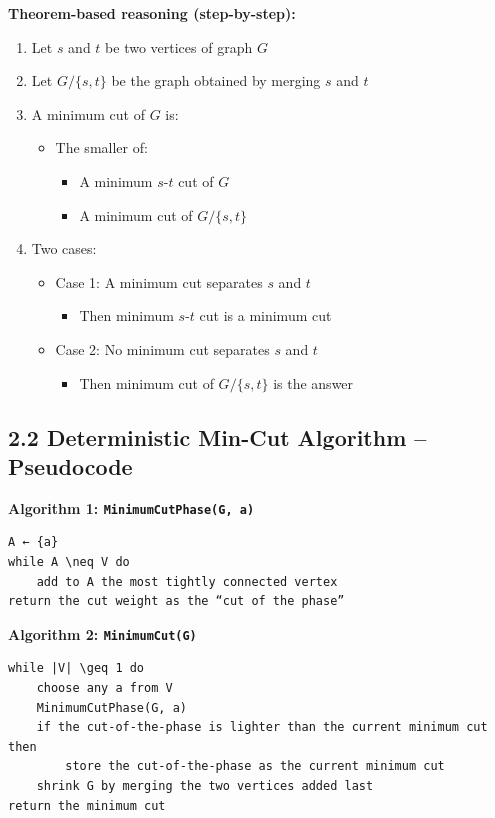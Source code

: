 \documentclass[11pt]{article}
\begin{document}
\textbf{Theorem-based reasoning (step-by-step):}
\begin{enumerate}
    \item Let \( s \) and \( t \) be two vertices of graph \( G \)
    \item Let \( G/\{s,t\} \) be the graph obtained by merging \( s \) and \( t \)
    \item A minimum cut of \( G \) is:
    \begin{itemize}
        \item The smaller of:
        \begin{itemize}
            \item A minimum \( s\text{-}t \) cut of \( G \)
            \item A minimum cut of \( G/\{s,t\} \)
        \end{itemize}
    \end{itemize}
    \item Two cases:
    \begin{itemize}
        \item Case 1: A minimum cut separates \( s \) and \( t \)
        \begin{itemize}
            \item Then minimum \( s\text{-}t \) cut is a minimum cut
        \end{itemize}
        \item Case 2: No minimum cut separates \( s \) and \( t \)
        \begin{itemize}
            \item Then minimum cut of \( G/\{s,t\} \) is the answer
        \end{itemize}
    \end{itemize}
\end{enumerate}

\subsection*{2.2 Deterministic Min-Cut Algorithm – Pseudocode}

\textbf{Algorithm 1: \texttt{MinimumCutPhase(G, a)}}
\begin{verbatim}
A ← {a}
while A \neq V do
    add to A the most tightly connected vertex
return the cut weight as the “cut of the phase”
\end{verbatim} 

\textbf{Algorithm 2: \texttt{MinimumCut(G)}}
\begin{verbatim}
while |V| \geq 1 do
    choose any a from V
    MinimumCutPhase(G, a)
    if the cut-of-the-phase is lighter than the current minimum cut then
        store the cut-of-the-phase as the current minimum cut
    shrink G by merging the two vertices added last
return the minimum cut
\end{verbatim} 
\end{document}
